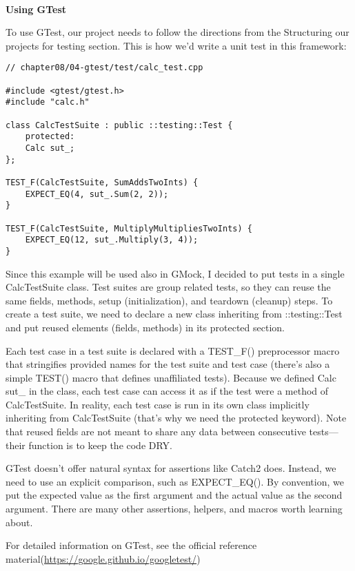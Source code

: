 \hspace*{\fill} \\ %
\noindent
\textbf{Using GTest}

To use GTest, our project needs to follow the directions from the Structuring our projects for testing section. This is how we'd write a unit test in this framework:

\begin{lstlisting}[style=styleCXX]
// chapter08/04-gtest/test/calc_test.cpp

#include <gtest/gtest.h>
#include "calc.h"

class CalcTestSuite : public ::testing::Test {
	protected:
	Calc sut_;
};

TEST_F(CalcTestSuite, SumAddsTwoInts) {
	EXPECT_EQ(4, sut_.Sum(2, 2));
}

TEST_F(CalcTestSuite, MultiplyMultipliesTwoInts) {
	EXPECT_EQ(12, sut_.Multiply(3, 4));
}
\end{lstlisting} 

Since this example will be used also in GMock, I decided to put tests in a single CalcTestSuite class. Test suites are group related tests, so they can reuse the same fields, methods, setup (initialization), and teardown (cleanup) steps. To create a test suite, we need to declare a new class inheriting from ::testing::Test and put reused elements (fields, methods) in its protected section.

Each test case in a test suite is declared with a TEST\_F() preprocessor macro that stringifies provided names for the test suite and test case (there's also a simple TEST() macro that defines unaffiliated tests). Because we defined Calc sut\_ in the class, each test case can access it as if the test were a method of CalcTestSuite. In reality, each test case is run in its own class implicitly inheriting from CalcTestSuite (that's why we need the protected keyword). Note that reused fields are not meant to share any data between consecutive tests—their function is to keep the code DRY.

GTest doesn't offer natural syntax for assertions like Catch2 does. Instead, we need to use an explicit comparison, such as EXPECT\_EQ(). By convention, we put the expected value as the first argument and the actual value as the second argument. There are many other assertions, helpers, and macros worth learning about.

\begin{tcolorbox}[colback=blue!5!white,colframe=blue!75!black,title=Note]
For detailed information on GTest, see the official reference material(\url{https://google.github.io/googletest/})
\end{tcolorbox}

